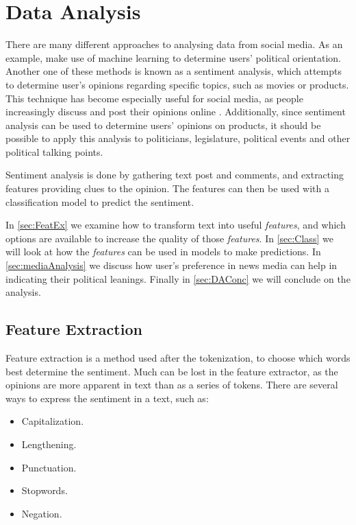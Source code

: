 \chapter{Data Analysis}\label{cha:DA}
There are many different approaches to analysing data from social media. As an
example,  make use of machine learning to
determine users' political orientation. Another one of these methods is known as
a sentiment analysis, which attempts to determine user's opinions regarding
specific topics, such as movies or products. This technique has become
especially useful for social media, as people increasingly discuss and post
their opinions online \citep[Overview 2]{Sentiment}. Additionally, since
sentiment analysis can be used to determine users' opinions on products, it
should be possible to apply this analysis to politicians, legislature, political
events and other political talking points.\nl

Sentiment analysis is done by gathering text post
and comments, and extracting features providing clues to the opinion. The
features can then be used with a classification model to predict the
sentiment.\nl

In \autoref{sec:FeatEx} we examine how to transform text into useful
\textit{features}, and which options are available to increase the quality of
those \textit{features}. In \autoref{sec:Class} we will look at how the
\textit{features} can be used in models to make predictions. In
\autoref{sec:mediaAnalysis} we discuss how user's preference in news media can
help in indicating their political leanings. Finally in \autoref{sec:DAConc} we
will conclude on the analysis.

\section{Feature Extraction}\label{sec:FeatEx}
Feature extraction is a method used after the tokenization, to choose which
words best determine the sentiment. Much can be lost in the feature extractor,
as the opinions are more apparent in text than as a series of tokens. There are
several ways to express the sentiment in a text, such
as\citep[Overview.3-4]{Sentiment}:


\begin{itemize}
  \item Capitalization. 
  \item Lengthening.
  \item Punctuation.
  \item Stopwords.
  \item Negation.
\end{itemize}

